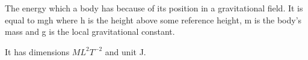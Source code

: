  The energy which a body has because of its position in a gravitational field.
It is equal to mgh where h is the height above some reference height,
m is the body's mass and g is the local gravitational constant.
\par
It has dimensions $ML^{2}T^{-2}$  and unit J.

